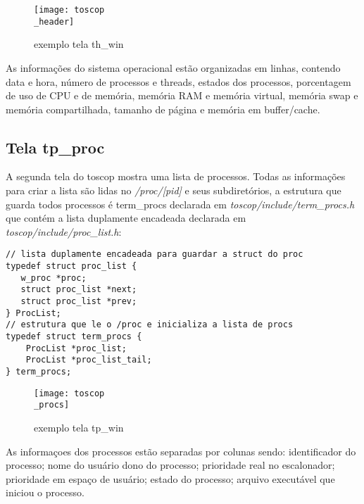 \documentclass{article}
\begin{document}
\begin{figure}[hb]
    \centering
    \texttt{[image: toscop\\\_header]}
    \caption{exemplo tela th\_win}
\end{figure}
As informações do sistema operacional estão organizadas em linhas, 
contendo data e hora, número de processos e threads, estados dos processos, 
porcentagem de uso de CPU e de memória, memória RAM e memória virtual,
memória swap e memória compartilhada, tamanho de página e memória em buffer/cache.

\subsection{Tela tp\_proc}
A segunda tela do toscop mostra uma lista de processos. Todas as 
informações para criar a lista são lidas no \textit{/proc/[pid]} e seus
subdiretórios, a estrutura que guarda todos processos é term\_procs declarada
em \textit{toscop/include/term\_procs.h} que contém a lista duplamente
encadeada declarada em \textit{toscop/include/proc\_list.h}:
\begin{verbatim}
// lista duplamente encadeada para guardar a struct do proc
typedef struct proc_list {
   w_proc *proc;
   struct proc_list *next;
   struct proc_list *prev;
} ProcList;
// estrutura que le o /proc e inicializa a lista de procs
typedef struct term_procs {
    ProcList *proc_list;
    ProcList *proc_list_tail;
} term_procs;
\end{verbatim}
\begin{figure}[hb]
    \centering
    \texttt{[image: toscop\\\_procs]}
    \caption{exemplo tela tp\_win}
\end{figure}
As informaçoes dos processos estão separadas por colunas sendo:
identificador do processo; nome do usuário dono do processo;
prioridade real no escalonador; prioridade em espaço de usuário;
estado do processo; arquivo executável que iniciou o processo.
\end{document}
